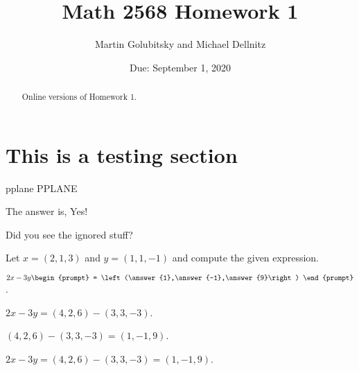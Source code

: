 \documentclass{ximera}
\date{Due: September 1, 2020}
\title{Math 2568 Homework 1}
\author{Martin Golubitsky and Michael Dellnitz}
\begin{document}
\begin{abstract}
Online versions of Homework 1.
\end{abstract}
\maketitle

\section*{This is a testing section}
pplane \pplane 
PPLANE \PPLANE

The answer is, \ans Yes! 

Did you see the ignored stuff?  




\problemlabel

\noindent Let $x=(2,1,3)$ and  $y=(1,1,-1)$ and compute the given expression.

\begin{exercise}  \label{c1.1.1B}
  $2x-3y\begin{prompt}
    = \left(\answer{1},\answer{-1},\answer{9}\right)
  \end{prompt}$.
  \begin{hint}
    $2x - 3y = (4,2,6) - (3,3,-3)$.
  \end{hint}
  \begin{hint}
    $(4,2,6) - (3,3,-3) = (1,-1,9)$.
  \end{hint}  

\begin{solution}
$2x - 3y = (4,2,6) - (3,3,-3) = (1,-1,9)$.

\end{solution}
\end{exercise}





\problemlabel
\end{document}
